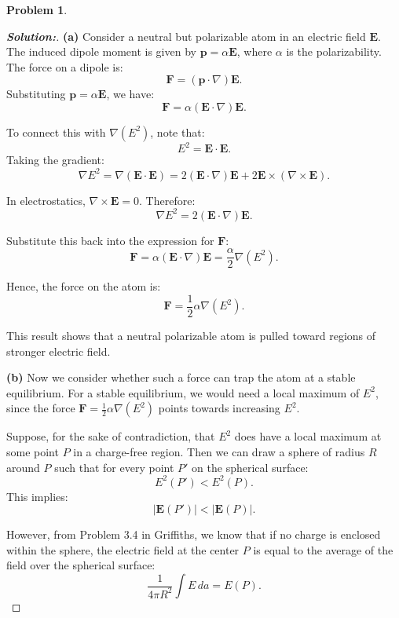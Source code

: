 \documentclass[12pt]{article}
\theoremstyle{definition}\newtheorem{problem}{Problem}
\newenvironment{solution}{\begin{proof}[\bfseries\textup{Solution:}]}{\end{proof}}
\begin{document}
\newpage
\begin{problem}
\end{problem}
\begin{solution}

    \noindent\textbf{(a)} Consider a neutral but polarizable atom in an electric field $\mathbf{E}$. The induced dipole moment is given by $\mathbf{p} = \alpha \mathbf{E}$, where $\alpha$ is the polarizability. The force on a dipole is:
    \[
    \mathbf{F} = (\mathbf{p} \cdot \nabla)\mathbf{E}.
    \]
    Substituting $\mathbf{p} = \alpha \mathbf{E}$, we have:
    \[
    \mathbf{F} = \alpha (\mathbf{E} \cdot \nabla)\mathbf{E}.
    \]
    
    To connect this with $\nabla(E^2)$, note that:
    \[
    E^2 = \mathbf{E} \cdot \mathbf{E}.
    \]
    Taking the gradient:
    \[
    \nabla E^2 = \nabla(\mathbf{E} \cdot \mathbf{E}) = 2(\mathbf{E} \cdot \nabla)\mathbf{E} + 2\mathbf{E} \times (\nabla \times \mathbf{E}).
    \]
    
    In electrostatics, $\nabla \times \mathbf{E} = 0$. Therefore:
    \[
    \nabla E^2 = 2(\mathbf{E} \cdot \nabla)\mathbf{E}.
    \]
    
    Substitute this back into the expression for $\mathbf{F}$:
    \[
    \mathbf{F} = \alpha (\mathbf{E} \cdot \nabla)\mathbf{E} = \frac{\alpha}{2} \nabla(E^2).
    \]
    
    Hence, the force on the atom is:
    \[
    \mathbf{F} = \frac{1}{2}\alpha \nabla(E^2).
    \]
    
    This result shows that a neutral polarizable atom is pulled toward regions of stronger electric field.
    
    \medskip
    
    \noindent\textbf{(b)} Now we consider whether such a force can trap the atom at a stable equilibrium. For a stable equilibrium, we would need a local maximum of $E^2$, since the force $\mathbf{F} = \tfrac{1}{2}\alpha \nabla(E^2)$ points towards increasing $E^2$.
    
    Suppose, for the sake of contradiction, that $E^2$ does have a local maximum at some point $P$ in a charge-free region. Then we can draw a sphere of radius $R$ around $P$ such that for every point $P'$ on the spherical surface:
    \[
    E^2(P') < E^2(P).
    \]
    This implies:
    \[
    |\mathbf{E}(P')| < |\mathbf{E}(P)|.
    \]
    
    However, from Problem 3.4 in Griffiths, we know that if no charge is enclosed within the sphere, the electric field at the center $P$ is equal to the average of the field over the spherical surface:
    \[
    \frac{1}{4\pi R^2}\int E \, da = E(P).
    \]
    

\end{solution}
\end{document}
